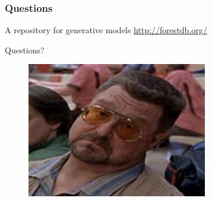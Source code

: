 \documentclass[usenames,dvipsnames]{beamer}
\begin{document}
\begin{frame}
  \frametitle{Questions}
  A repository for generative models \url{http://forestdb.org/}
  \begin{center}
    \Huge{Questions?}
  \end{center}
  \begin{figure}
    \centering
    \includegraphics[width=0.7\textwidth, height=0.6\textheight]{figures/walter.jpg}
  \end{figure}
\end{frame}
\end{document}
